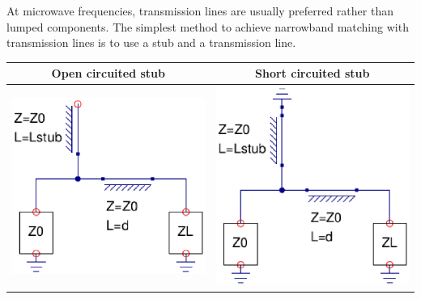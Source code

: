 At microwave frequencies, transmission lines are usually preferred rather than lumped components. The simplest method to achieve narrowband matching with transmission lines is to use a stub and a transmission line.

\begin{table}[H]
  \centering
  \begin{tabular}{ | c | c | }
    \hline
    Open circuited stub & Short circuited stub\\ \hline
    \begin{minipage}{.4\textwidth}
      \includegraphics[width=\linewidth]{SingleStubOpen}
    \end{minipage}
    &
    \begin{minipage}{.4\textwidth}
      \includegraphics[width=\linewidth]{SingleStubShort}

\end{minipage}
\end{tabular}
\end{table}
